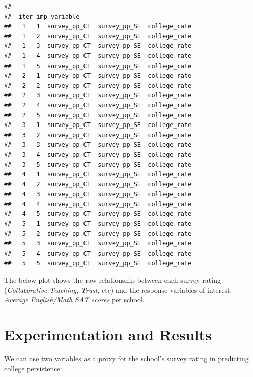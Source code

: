 \documentclass[
  man]{apa6}
\begin{document}
\begin{verbatim}
## 
##  iter imp variable
##   1   1  survey_pp_CT  survey_pp_SE  college_rate
##   1   2  survey_pp_CT  survey_pp_SE  college_rate
##   1   3  survey_pp_CT  survey_pp_SE  college_rate
##   1   4  survey_pp_CT  survey_pp_SE  college_rate
##   1   5  survey_pp_CT  survey_pp_SE  college_rate
##   2   1  survey_pp_CT  survey_pp_SE  college_rate
##   2   2  survey_pp_CT  survey_pp_SE  college_rate
##   2   3  survey_pp_CT  survey_pp_SE  college_rate
##   2   4  survey_pp_CT  survey_pp_SE  college_rate
##   2   5  survey_pp_CT  survey_pp_SE  college_rate
##   3   1  survey_pp_CT  survey_pp_SE  college_rate
##   3   2  survey_pp_CT  survey_pp_SE  college_rate
##   3   3  survey_pp_CT  survey_pp_SE  college_rate
##   3   4  survey_pp_CT  survey_pp_SE  college_rate
##   3   5  survey_pp_CT  survey_pp_SE  college_rate
##   4   1  survey_pp_CT  survey_pp_SE  college_rate
##   4   2  survey_pp_CT  survey_pp_SE  college_rate
##   4   3  survey_pp_CT  survey_pp_SE  college_rate
##   4   4  survey_pp_CT  survey_pp_SE  college_rate
##   4   5  survey_pp_CT  survey_pp_SE  college_rate
##   5   1  survey_pp_CT  survey_pp_SE  college_rate
##   5   2  survey_pp_CT  survey_pp_SE  college_rate
##   5   3  survey_pp_CT  survey_pp_SE  college_rate
##   5   4  survey_pp_CT  survey_pp_SE  college_rate
##   5   5  survey_pp_CT  survey_pp_SE  college_rate
\end{verbatim}

The below plot shows the raw relationship between each survey rating (\emph{Collaborative Teaching}, \emph{Trust}, etc) and the response variables of interest: \emph{Average English/Math SAT scores} per school.

\hypertarget{experimentation-and-results}{%
\section{Experimentation and Results}\label{experimentation-and-results}}

We can use two variables as a proxy for the school's survey rating in predicting college persistence:
\end{document}
